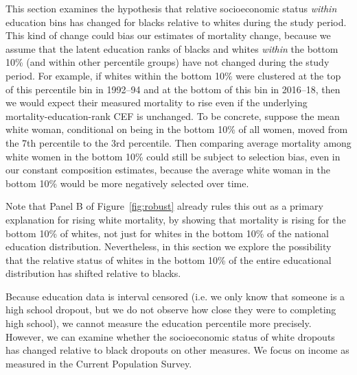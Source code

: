 
This section examines the hypothesis that relative socioeconomic
status \textit{within} education bins has changed for blacks relative
to whites during the study period. This kind of change could bias our
estimates of mortality change, because we assume that the latent
education ranks of blacks and whites \textit{within} the bottom 10\%
(and within other percentile groups) have not changed during the study
period. For example, if whites within the bottom 10\% were clustered
at the top of this percentile bin in 1992--94 and at the bottom of this
bin in 2016--18, then we would expect their measured mortality to rise
even if the underlying mortality-education-rank CEF is unchanged.  To
be concrete, suppose the mean white woman, conditional on being in the
bottom 10\% of all women, moved from the 7th percentile to the 3rd
percentile. Then comparing average mortality among white women in the
bottom 10\% could still be subject to selection bias, even in our
constant composition estimates, because the average white woman in the
bottom 10\% would be more negatively selected over time.

Note that Panel B of Figure~\ref{fig:robust} already rules this out as a
primary explanation for rising white mortality, by showing that
mortality is rising for the bottom 10\% of whites, not just for whites in
the bottom 10\% of the national education distribution. Nevertheless,
in this section we explore the possibility that the relative status of
whites in the bottom 10\% of the entire educational distribution has
shifted relative to blacks.

Because education data is interval censored (i.e. we only know that
someone is a high school dropout, but we do not observe how close they
were to completing high school), we cannot measure the education
percentile more precisely. However, we can examine whether the
socioeconomic status of white dropouts has changed relative to black
dropouts on other measures. We focus on income as measured in the
Current Population Survey.

